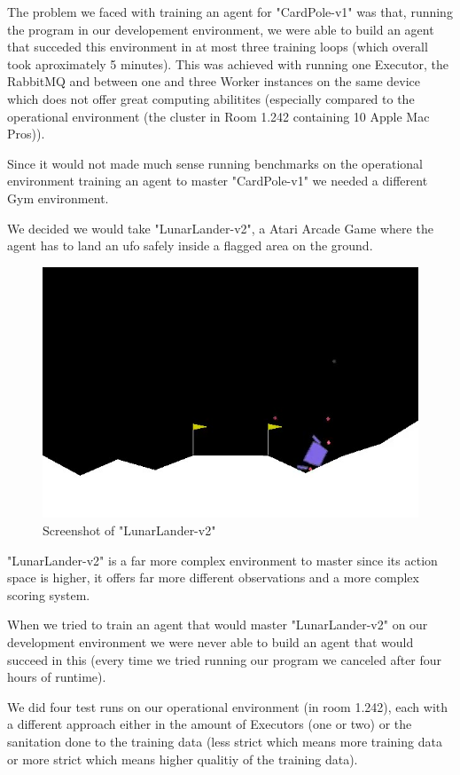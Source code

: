 The problem we faced with training an agent for
"CardPole-v1" was that, running the program in our
developement environment, we were able to build an agent
that succeded this environment in at most three training
loops (which overall took aproximately 5 minutes). This was
achieved with running one Executor, the RabbitMQ and
between one and three Worker instances on the same device
which does not offer great computing abilitites (especially
compared to the operational environment (the cluster in
Room 1.242 containing 10 Apple Mac Pros)).

Since it would not made much sense running benchmarks on
the operational environment training an agent to master
"CardPole-v1" we needed a different Gym environment.

We decided we would take "LunarLander-v2", a Atari Arcade
Game where the agent has to land an ufo safely inside a
flagged area on the ground.

\begin{figure}[H]
  \centering
  \includegraphics[width=\textwidth/2]
  {diagrams/lunarlander.jpg}
  \caption{Screenshot of "LunarLander-v2"}
\end{figure}

"LunarLander-v2" is a far more complex environment to
master since its action space is higher, it offers far more
different observations and a more complex scoring system.

When we tried to train an agent that would master
"LunarLander-v2" on our development environment we were
never able to build an agent that would succeed in this
(every time we tried running our program we canceled after
four hours of runtime).

We did four test runs on our operational environment (in
room 1.242), each with a different approach either in the
amount of Executors (one or two) or the sanitation done
to the training data (less strict which means more training
data or more strict which means higher qualitiy of the
training data).

